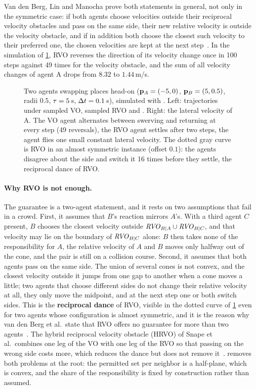 Van den Berg, Lin and Manocha prove both statements in general, not only in
the symmetric case: if both agents choose velocities outside their
reciprocal velocity obstacles and pass on the same side, their new relative
velocity is outside the velocity obstacle, and if in addition both choose
the closest such velocity to their preferred one, the chosen velocities are
kept at the next step~\cite{vandenberg2008rvo}. In the simulation of
\cref{fig:ch13-dance}, RVO reverses the direction of its velocity change once
in 100 steps against 49 times for the velocity obstacle, and the sum of all
velocity changes of agent A drops from $8.32$ to $1.44$\,m/s.

\begin{figure}[tb]
  \centering
  \caption{Two agents swapping places head-on ($\mathbf{p}_A = (-5, 0)$,
  $\mathbf{p}_B = (5, 0.5)$, radii $0.5$, $\tau = 5$\,s, $\Delta t = 0.1$\,s), simulated
  with . Left: trajectories under sampled VO, sampled
  RVO and \orca. Right: the lateral velocity of A. The VO agent alternates
  between swerving and returning at every step (49 reversals), the RVO agent
  settles after two steps, the \orca agent flies one small constant lateral
  velocity. The dotted gray curve is RVO in an almost symmetric instance
  (offset $0.1$): the agents disagree about the side and switch it 16 times
  before they settle, the reciprocal dance of RVO.}
  \label{fig:ch13-dance}
\end{figure}

\paragraph{Why RVO is not enough.}
The guarantee is a two-agent statement, and it rests on two assumptions that
fail in a crowd. First, it assumes that $B$'s reaction mirrors $A$'s. With a
third agent $C$ present, $B$ chooses the closest velocity outside
$\mathit{RVO}_{B|A} \cup \mathit{RVO}_{B|C}$, and that velocity may lie on the boundary of
$\mathit{RVO}_{B|C}$ alone: $B$ then takes none of the responsibility for $A$, the
relative velocity of $A$ and $B$ moves only halfway out of the cone, and the
pair is still on a collision course. Second, it assumes that both agents pass
on the same side. The union of several cones is not convex, and the closest
velocity outside it jumps from one gap to another when a cone moves a little;
two agents that choose different sides do not change their relative velocity
at all, they only move the midpoint, and at the next step one or both switch
sides. This is the \textbf{reciprocal dance}
of RVO, visible in the dotted curve of \cref{fig:ch13-dance} even for two
agents whose configuration is almost symmetric, and it is the reason why
van den Berg et al.\ state that RVO offers no guarantee for more than two
agents~\cite{vandenberg2011orca}. The hybrid reciprocal velocity obstacle
(HRVO) of Snape et al.\ combines one leg of the VO with one leg of the RVO
so that passing on the wrong side costs more, which reduces the dance but
does not remove it~\cite{snape2011hrvo}. \orca removes both problems at the
root: the permitted set per neighbor is a half-plane, which is convex, and
the share of the responsibility is fixed by construction rather than
assumed.


